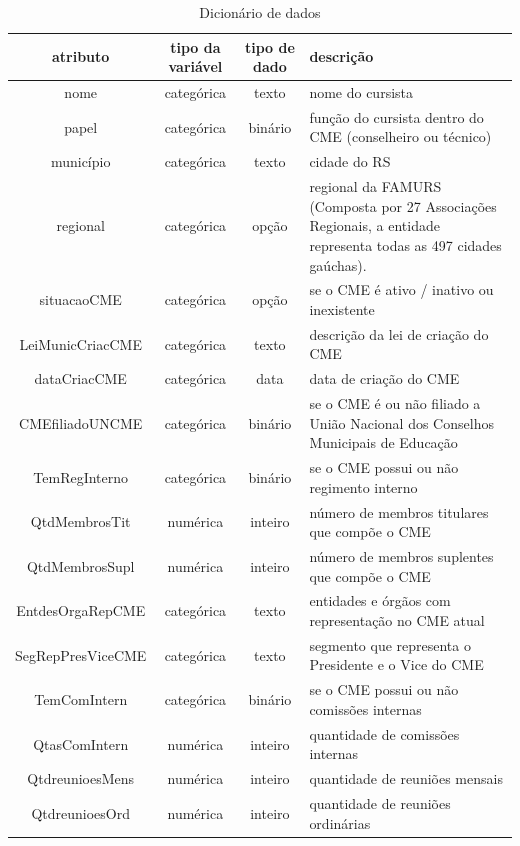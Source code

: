 \documentclass[tg]{mdtufsm}
\begin{document}
\begin{center}
	\begin{longtabu} to \textwidth {|c|c|c|X|} 
		\caption{Dicionário de dados}  \\
		\hline 
		atributo & tipo da variável & tipo de dado & descrição \\ \hline \hline
		nome & categórica & texto & nome do cursista \\ \hline
		papel & categórica & binário & função do cursista dentro do CME (conselheiro ou técnico) \\ \hline
		município & categórica & texto & cidade do RS \\ \hline
		regional & categórica & opção & regional da FAMURS (Composta por 27 Associações Regionais, a entidade representa todas as 497 cidades gaúchas). \\ \hline
		situacaoCME & categórica & opção & se o CME é ativo / inativo ou inexistente \\ \hline
		LeiMunicCriacCME & categórica & texto & descrição da lei de criação do CME \\ \hline
		dataCriacCME & categórica & data & data de criação do CME \\ \hline
		CMEfiliadoUNCME & categórica & binário & se o CME é ou não filiado a União Nacional dos Conselhos Municipais de Educação \\ \hline
		TemRegInterno & categórica & binário & se o CME possui ou não regimento interno \\ \hline
		QtdMembrosTit & numérica & inteiro & número de membros titulares que compõe o CME \\ \hline
		QtdMembrosSupl & numérica & inteiro & número de membros suplentes que compõe o CME \\ \hline
		EntdesOrgaRepCME & categórica & texto & entidades e órgãos com representação no CME atual \\ \hline
		SegRepPresViceCME & categórica & texto & segmento que representa o Presidente e o Vice do CME \\ \hline
		TemComIntern & categórica & binário & se o CME possui ou não comissões internas \\ \hline
		QtasComIntern & numérica & inteiro & quantidade de comissões internas  \\ \hline
		QtdreunioesMens & numérica & inteiro & quantidade de reuniões mensais \\ \hline
		QtdreunioesOrd & numérica & inteiro & quantidade de reuniões ordinárias \\ \hline

\end{longtabu}
\end{center}
\end{document}
